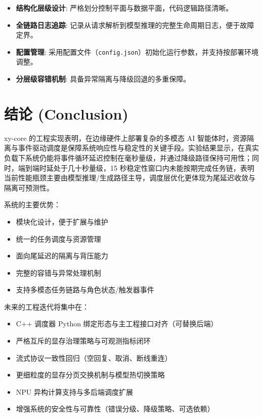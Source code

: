 \documentclass[a4paper,12pt]{article}
\begin{document}
\begin{itemize}
    \item \textbf{结构化层级设计}: 严格划分控制平面与数据平面，代码逻辑路径清晰。
    \item \textbf{全链路日志追踪}: 记录从请求解析到模型推理的完整生命周期日志，便于故障定界。
    \item \textbf{配置管理}: 采用配置文件（\texttt{config.json}）初始化运行参数，并支持按部署环境调整。
    \item \textbf{分层级容错机制}: 具备异常隔离与降级回退的多重保障。
\end{itemize}

\section{结论 (Conclusion)}

xy-core 的工程实现表明，在边缘硬件上部署复杂的多模态 AI 智能体时，资源隔离与事件驱动调度是保障系统响应性与稳定性的关键手段。实验结果显示，在真实负载下系统仍能将事件循环延迟控制在毫秒量级，并通过降级路径保持可用性；同时，端到端时延处于几十秒量级，15 秒稳定性窗口内未能按期完成任务链，表明当前性能瓶颈主要由模型推理/生成路径主导，调度层优化更体现为尾延迟收敛与隔离可预测性。

系统的主要优势：
\begin{itemize}
    \item 模块化设计，便于扩展与维护
    \item 统一的任务调度与资源管理
    \item 面向尾延迟的隔离与背压能力
    \item 完整的容错与异常处理机制
    \item 支持多模态任务链路与角色状态/触发器事件
\end{itemize}

未来的工程迭代将集中在：
\begin{itemize}
    \item C++ 调度器 Python 绑定形态与主工程接口对齐（可替换后端）
    \item 严格互斥的显存治理策略与可观测指标闭环
    \item 流式协议一致性回归（空回复、取消、断线重连）
    \item 更细粒度的显存分页交换机制与模型热切换策略
    \item NPU 异构计算支持与多后端调度扩展
    \item 增强系统的安全性与可靠性（错误分级、降级策略、可选依赖）
\end{itemize}
\end{document}
